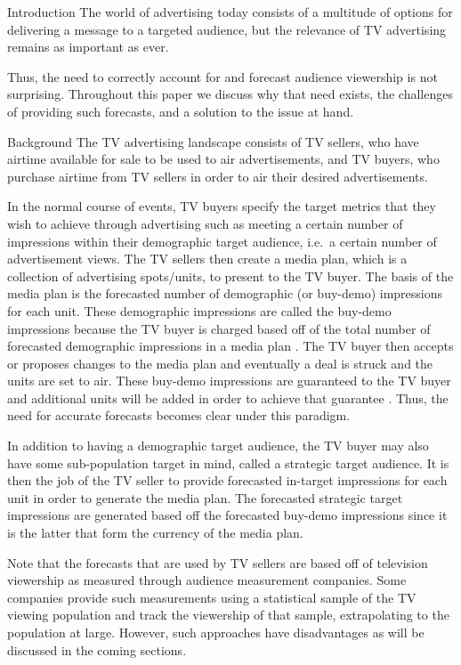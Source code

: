 \begin{chapter}{Introduction}\label{introduction}
  The world of advertising today consists of a multitude of options
  for delivering a message to a targeted audience, but the relevance of TV advertising
  remains as important as ever.

  Thus, the need to correctly account for and forecast audience viewership is not surprising.
  Throughout this paper we discuss why that need exists, the challenges of providing such forecasts,
  and a solution to the issue at hand.

\begin{section}{Background}
  The TV advertising landscape consists of TV sellers, who have airtime available
  for sale to be used to air advertisements, and TV buyers, who purchase airtime
  from TV sellers in order to air their desired advertisements.

  In the normal course of events, TV buyers specify the target metrics that
  they wish to achieve through advertising such as meeting a certain number of impressions within their demographic target audience,
  i.e.\ a certain number of advertisement views.
  The TV sellers then create a media plan, which is a collection of advertising spots/units, to present to the TV buyer.
  The basis of the media plan is the forecasted number of demographic (or buy-demo) impressions for each unit.
  These demographic impressions are called the buy-demo impressions because the TV buyer is charged
  based off of the total number of forecasted demographic impressions in a media plan .
  The TV buyer then accepts or proposes changes to the media plan and eventually
  a deal is struck and the units are set to air. These buy-demo impressions are guaranteed to
  the TV buyer and additional units will be added in order to achieve that guarantee \cite{tvforecasting}. Thus, the need
  for accurate forecasts becomes clear under this paradigm.

  In addition to having a demographic target audience, the TV buyer may also have some sub-population
  target in mind, called a strategic target audience. It is then the job of the TV seller to
  provide forecasted in-target impressions for each unit in order to generate the media plan.
  The forecasted strategic target impressions are generated based off the
  forecasted buy-demo impressions since it is the latter
  that form the currency of the media plan.

  Note that the forecasts that are used by TV sellers are based off of
  television viewership as measured through audience measurement companies. Some companies
  provide such measurements
  using a statistical sample of the TV viewing population
  and track the viewership of that sample, extrapolating to the population at large.
  However, such approaches have disadvantages as will be discussed in the coming sections.
\end{section}


\end{chapter}
